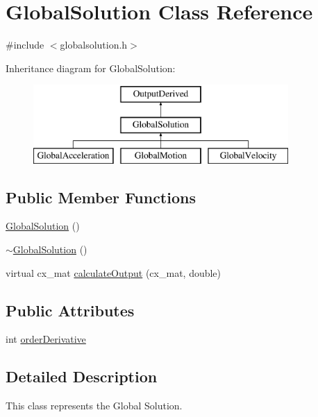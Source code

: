 \hypertarget{class_global_solution}{\section{Global\-Solution Class Reference}
\label{class_global_solution}
}


{\ttfamily \#include $<$globalsolution.\-h$>$}

Inheritance diagram for Global\-Solution\-:\begin{figure}[H]
\begin{center}
\leavevmode
\includegraphics[height=3.000000cm]{class_global_solution}
\end{center}
\end{figure}
\subsection*{Public Member Functions}
\begin{DoxyCompactItemize}
\item 
\hyperlink{class_global_solution_a27fcfb056c30fc07f8937bc71ec677e6}{Global\-Solution} ()
\item 
\hyperlink{class_global_solution_aea630b237ced06e04c5ea00bf1bb9398}{$\sim$\-Global\-Solution} ()
\item 
virtual cx\-\_\-mat \hyperlink{class_global_solution_a15634073f63559cbfd65b32b79cd7fbd}{calculate\-Output} (cx\-\_\-mat, double)
\end{DoxyCompactItemize}
\subsection*{Public Attributes}
\begin{DoxyCompactItemize}
\item 
int \hyperlink{class_global_solution_a026746ffb8e416eb4142a058b108148c}{order\-Derivative}
\end{DoxyCompactItemize}


\subsection{Detailed Description}
This class represents the Global Solution. 

